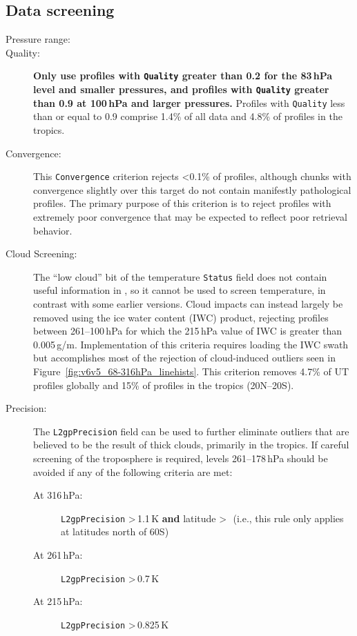 \begin{nofloatpages}
\subsection{Data screening}
\label{sec:TemperatureScreening}
\begin{description}
  \item[Pressure range:]  \standardrangestatement \standardprecisionrule \evenstatusrule

  \item[Quality:] \textbf{Only use profiles with \texttt{Quality} greater than 0.2 for the 83\,hPa level and smaller pressures, and profiles with \texttt{Quality} greater than 0.9 at 100\,hPa and larger pressures.} Profiles with \texttt{Quality} less than or equal to 0.9 comprise 1.4\% of all data and 4.8\% of profiles in the tropics.

  \item[Convergence:]  This \texttt{Convergence} criterion rejects \textless0.1\% of profiles, although chunks with convergence slightly over this target do not contain manifestly pathological profiles. The primary purpose of this criterion is to reject profiles with extremely poor convergence that may be expected to reflect poor retrieval behavior.

  \item[Cloud Screening:] The ``low cloud'' bit of the temperature \texttt{Status} field does not contain useful information in \thisv, so it cannot be used to screen temperature, in contrast with some earlier versions. Cloud impacts can instead largely be removed using the ice water content (IWC) product, rejecting profiles between 261--100\,hPa for which the 215\,hPa value of IWC is greater than 0.005\,g/m. Implementation of this criteria requires loading the \thisv IWC swath but accomplishes most of the rejection of cloud-induced outliers seen in Figure~\ref{fig:v6v5_68-316hPa_linehists}. This criterion removes 4.7\% of UT profiles globally and 15\% of profiles in the tropics (20\degsym{}N--20\degsym{}S).

  \item[Precision:] The \texttt{L2gpPrecision} field can be used to further eliminate outliers that are believed to be the result of thick clouds, primarily in the tropics. If careful screening of the troposphere is required, levels 261--178\,hPa should be avoided if any of the following criteria are met:
    \begin{description}
      \item[At 316\,hPa:] \texttt{L2gpPrecision} \textgreater\,1.1\,K \textbf{and} latitude \textgreater\,\degsym\ (i.e., this rule only applies at latitudes north of 60\degsym{}S)
      \item[At 261\,hPa:] \texttt{L2gpPrecision} \textgreater\,0.7\,K
      \item[At 215\,hPa:] \texttt{L2gpPrecision} \textgreater\,0.825\,K
    \end{description}
\end{description}
\end{nofloatpages}

